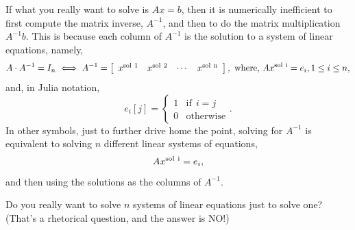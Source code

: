 \documentclass[letterpaper]{book}
\begin{document}
\begin{tcolorbox}[sharp corners, colback=lightergray, colframe=red, title=\textbf{\Large If at all Possible, Avoid Computing $A^{-1}$ Because it is Numerically Expensive}]
If what you really want to solve is $A x = b$, then it is numerically inefficient to first compute the matrix inverse, $A^{-1}$, and then to do the matrix multiplication $A^{-1} b$. This is because each column of $A^{-1}$ is the solution to a system of linear equations, namely,
\begin{equation}
\label{eq:SolveForInvA}
    A \cdot A^{-1} = I_n \iff A^{-1} = \left[\begin{array}{cccc} x^{\rm sol~1} & x^{\rm sol~2} & \cdots & x^{\rm sol~n}  \end{array} \right], \text{ where, }A x^{\rm sol~i} = e_i, 1 \le i \le n,
\end{equation}
and, in Julia notation, 
$$e_i[j]=\begin{cases} 1 &  \text{if}~~i = j \\ 0 & \text{otherwise}\end{cases}.$$
In other symbols, just to further drive home the point, solving for $A^{-1}$ is equivalent to solving $n$ different linear systems of equations, 
$$A x^{\rm sol~i} = e_i,$$ 
and then using the solutions as the columns of $A^{-1}$. 
\end{tcolorbox}
\vspace*{1cm}

{\Huge Do you really want to solve $n$ systems of linear equations just to solve one? (That's a rhetorical question, and the answer is NO!)}\\ 
\end{document}
